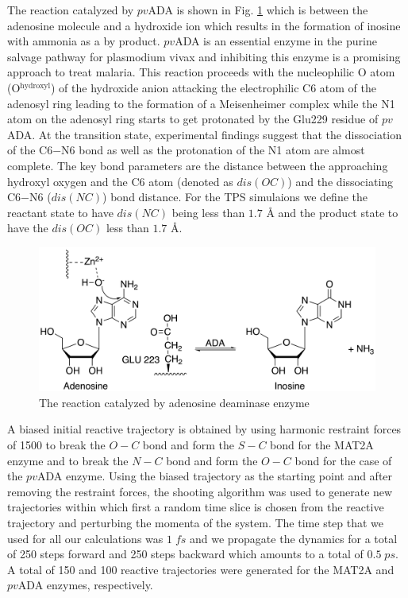 \documentclass[journal=jpcbfk,manuscript=article,layout=traditional]{achemso}
\begin{document}
The reaction catalyzed by $pv$ADA is shown in  
Fig. \ref{fig:ada-reaction} which is between the adenosine molecule and a hydroxide ion
which results in the formation of inosine with ammonia as a by product. 
$pv$ADA is an essential enzyme in the purine salvage pathway for plasmodium vivax and 
inhibiting this enzyme is a promising approach to treat malaria. \cite{Madrid08JBiolChem283p35899}  
This reaction proceeds with the nucleophilic O atom (O$^{\text{hydroxyl}}$) of the hydroxide anion
attacking the electrophilic C6 atom of the adenosyl ring leading to the formation of a Meisenheimer 
complex while the N1 atom on the adenosyl ring starts to get 
protonated by the Glu229 residue of $pv$ADA. At the transition state, experimental findings 
suggest that the dissociation of the C6$-$N6 bond as well as the protonation of the N1 
atom are almost complete. \cite{Luo07JAmChemSoc129p8008} The key bond parameters are 
the distance between the approaching hydroxyl oxygen and the C6 atom (denoted as $dis(OC)$) and the 
dissociating C6$-$N6 ($dis(NC)$) bond distance. For the TPS simulaions we define the reactant state to 
have $dis(NC)$ being less than $1.7$ {\AA} and the product state to have the 
$dis(OC)$ less than $1.7$ {\AA}.

\begin{figure}
\includegraphics[scale=0.6]{figures/ada-new.png}
\caption{The reaction catalyzed by adenosine deaminase enzyme}
\label{fig:ada-reaction}
\end{figure}

A biased initial reactive trajectory is obtained by using harmonic restraint forces 
of 1500 to break the $O-C$ bond and form the $S-C$ bond for the MAT2A enzyme and 
to break the $N-C$ bond and form the $O-C$ bond for the case of the $pv$ADA enzyme. 
Using the biased trajectory as the starting point and after removing the restraint 
forces, the shooting algorithm was used to generate
new trajectories within which first a random time slice is chosen from the reactive 
trajectory and perturbing the momenta of the system. 
The time step that we used for all our calculations was $1\;fs$ and we propagate the 
dynamics for a total of 250 steps forward and 250 steps backward which amounts to a 
total of $0.5\;ps$. 
A total of 150 and 100 reactive trajectories were generated for the MAT2A and $pv$ADA
enzymes, respectively. 
\end{document}
